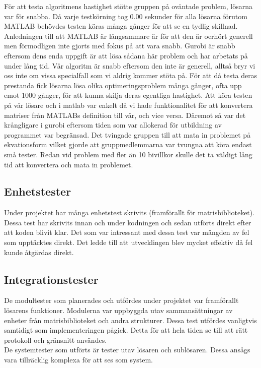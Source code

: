 	För att testa algoritmens hastighet stötte gruppen på oväntade problem, lösarna var för snabba.	Då varje testkörning tog 0.00 sekunder för alla lösarna förutom MATLAB behövdes testen köras många gånger för att se en tydlig skillnad. Anledningen till att MATLAB är långsammare är för att den är oerhört generell men förmodligen inte gjorts med fokus på att vara snabb. Gurobi är snabb eftersom dens enda uppgift är att lösa sådana här problem och har arbetats på under lång tid. Vår algoritm är snabb eftersom den inte är generell, alltså bryr vi oss inte om vissa specialfall som vi aldrig kommer stöta på. \newline
	För att då testa deras prestanda fick lösarna lösa olika optimeringsproblem många gånger, ofta upp emot 1000 gånger, för att kunna skilja deras egentliga hastighet. Att köra testen på vår lösare och i matlab var enkelt då vi hade funktionalitet för att konvertera matriser från MATLABs definition till vår, och vice versa. Däremot så var det krångligare i gurobi eftersom tiden som var allokerad för utbildning av programmet var begränsad. Det tvingade gruppen till att mata in problemet på ekvationsform vilket gjorde att gruppmedlemmarna var tvungna att köra endast små tester. Redan vid problem med fler än 10 bivillkor skulle det ta väldigt lång tid att konvertera och mata in problemet. \newline
	
	
	\subsection{Enhetstester}
	Under projektet har många enhetstest skrivits (framförallt för matrisbiblioteket). Dessa test har skrivits innan och under kodningen och sedan utförts direkt efter att koden blivit klar. Det som var intressant med dessa test var mängden av fel som upptäcktes direkt. Det ledde till att utvecklingen blev mycket effektiv då fel kunde åtgärdas direkt.
	
	\subsection{Integrationstester}
	De modultester som planerades och utfördes under projektet var framförallt lösarens funktioner. Modulerna var uppbyggda utav sammansättningar av enheter från matrisbiblioteket och andra strukturer. Dessa test utfördes vanligtvis samtidigt som implementeringen pågick. Detta för att hela tiden se till att rätt protokoll och gränsnitt användes.\\
De systemtester som utförts är tester utav lösaren och sublösaren. Dessa ansågs vara tillräcklig komplexa för att ses som system. 
	
